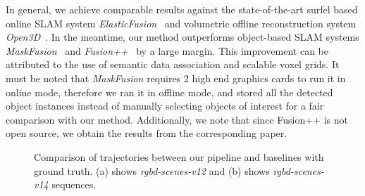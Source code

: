 In general, we achieve comparable results against the state-of-the-art surfel based online SLAM system \textit{ElasticFusion}~\cite{whelanElasticFusionDenseSLAM2015} and volumetric offline reconstruction system \textit{Open3D}~\cite{zhouOpen3DModernLibrary2018}. In the meantime, our method outperforms object-based SLAM systems \textit{MaskFusion}~\cite{runzMaskFusionRealTimeRecognition2018} and \textit{Fusion++}~\cite{mccormacFusionVolumetricObjectLevel2018} by a large margin. This improvement can be attributed to the use of semantic data association and scalable voxel grids. It must be noted that \textit{MaskFusion} requires 2 high end graphics cards to run it in online mode, therefore we ran it in offline mode, and stored all the detected object instances instead of manually selecting objects of interest for a fair comparison with our method. Additionally, we note that since Fusion++ is not open source, we obtain the results from the corresponding paper.

\begin{figure}[t!]
    \centering
    \caption{Comparison of trajectories between our pipeline and baselines with ground truth. (a) shows \emph{rgbd-scenes-v12} and (b) shows \emph{rgbd-scenes-v14} sequences. }
    \vspace*{-1em}
    \label{fig:rgbd_scenes-ape}
\end{figure}

